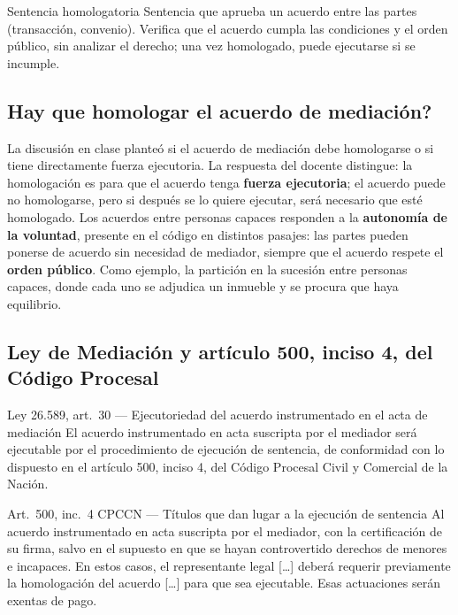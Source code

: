 \documentclass[12pt,oneside]{book}
\begin{document}
\begin{definition}{Sentencia homologatoria}
Sentencia que aprueba un acuerdo entre las partes (transacci\'on, convenio). Verifica que el acuerdo cumpla las condiciones y el orden p\'ublico, sin analizar el derecho; una vez homologado, puede ejecutarse si se incumple.
\end{definition}

\subsection{\textquestiondown Hay que homologar el acuerdo de mediaci\'on?}

La discusi\'on en clase plante\'o si el acuerdo de mediaci\'on debe homologarse o si tiene directamente fuerza ejecutoria. La respuesta del docente distingue: la homologaci\'on es para que el acuerdo tenga \textbf{fuerza ejecutoria}; el acuerdo puede no homologarse, pero si despu\'es se lo quiere ejecutar, ser\'a necesario que est\'e homologado. Los acuerdos entre personas capaces responden a la \textbf{autonom\'ia de la voluntad}, presente en el c\'odigo en distintos pasajes: las partes pueden ponerse de acuerdo sin necesidad de mediador, siempre que el acuerdo respete el \textbf{orden p\'ublico}. Como ejemplo, la partici\'on en la sucesi\'on entre personas capaces, donde cada uno se adjudica un inmueble y se procura que haya equilibrio.

\subsection{Ley de Mediaci\'on y art\'iculo 500, inciso 4, del C\'odigo Procesal}

\begin{norma}{Ley 26.589, art.~30 --- Ejecutoriedad del acuerdo instrumentado en el acta de mediaci\'on}
El acuerdo instrumentado en acta suscripta por el mediador ser\'a ejecutable por el procedimiento de ejecuci\'on de sentencia, de conformidad con lo dispuesto en el art\'iculo 500, inciso 4, del C\'odigo Procesal Civil y Comercial de la Naci\'on.
\end{norma}

\begin{norma}{Art.~500, inc.~4 CPCCN --- T\'itulos que dan lugar a la ejecuci\'on de sentencia}
Al acuerdo instrumentado en acta suscripta por el mediador, con la certificaci\'on de su firma, salvo en el supuesto en que se hayan controvertido derechos de menores e incapaces. En estos casos, el representante legal [\ldots] deber\'a requerir previamente la homologaci\'on del acuerdo [\ldots] para que sea ejecutable. Esas actuaciones ser\'an exentas de pago.
\end{norma}
\end{document}
